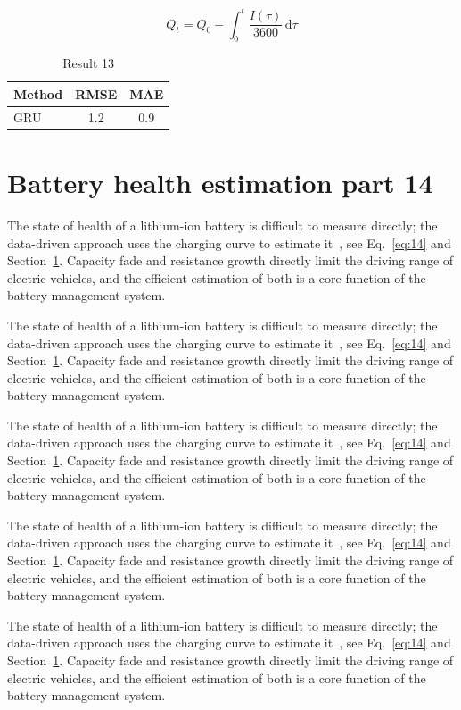 \documentclass[11pt]{article}
\begin{document}
\begin{equation}\label{eq:13}
  Q_t = Q_0 - \int_0^t \frac{I(\tau)}{3600}\,\mathrm{d}\tau
\end{equation}
\begin{table}[h]\centering\begin{tabular}{lcc}\toprule Method & RMSE & MAE\\\midrule GRU & 1.2 & 0.9\\\bottomrule\end{tabular}\caption{Result 13}\end{table}

\section{Battery health estimation part 14}\label{sec:14}
The state of health of a lithium-ion battery is difficult to measure directly; the data-driven approach uses the charging curve to estimate it~\cite{a2020}, see Eq.~\eqref{eq:14} and Section~\ref{sec:14}. Capacity fade and resistance growth directly limit the driving range of electric vehicles, and the efficient estimation of both is a core function of the battery management system.

The state of health of a lithium-ion battery is difficult to measure directly; the data-driven approach uses the charging curve to estimate it~\cite{a2020}, see Eq.~\eqref{eq:14} and Section~\ref{sec:14}. Capacity fade and resistance growth directly limit the driving range of electric vehicles, and the efficient estimation of both is a core function of the battery management system.

The state of health of a lithium-ion battery is difficult to measure directly; the data-driven approach uses the charging curve to estimate it~\cite{a2020}, see Eq.~\eqref{eq:14} and Section~\ref{sec:14}. Capacity fade and resistance growth directly limit the driving range of electric vehicles, and the efficient estimation of both is a core function of the battery management system.

The state of health of a lithium-ion battery is difficult to measure directly; the data-driven approach uses the charging curve to estimate it~\cite{a2020}, see Eq.~\eqref{eq:14} and Section~\ref{sec:14}. Capacity fade and resistance growth directly limit the driving range of electric vehicles, and the efficient estimation of both is a core function of the battery management system.

The state of health of a lithium-ion battery is difficult to measure directly; the data-driven approach uses the charging curve to estimate it~\cite{a2020}, see Eq.~\eqref{eq:14} and Section~\ref{sec:14}. Capacity fade and resistance growth directly limit the driving range of electric vehicles, and the efficient estimation of both is a core function of the battery management system.
\end{document}
